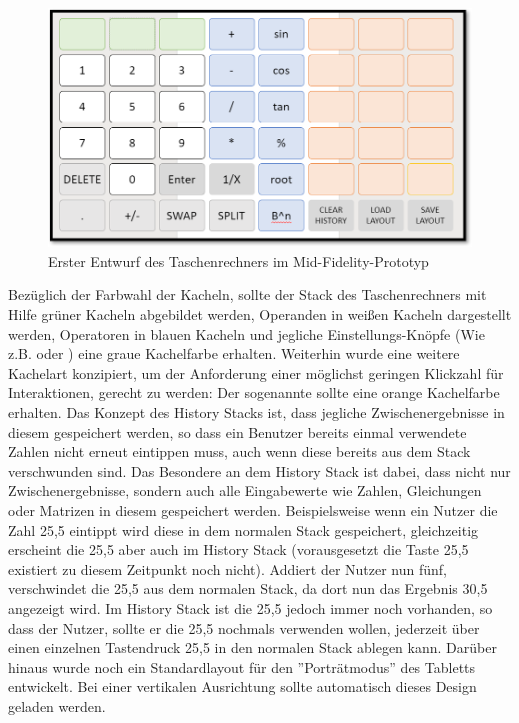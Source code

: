 \begin{figure}[!h]
	\includegraphics[scale=1]{img/erster-entwurf-mid-fidelty-prototyp}
	\caption[Erster Entwurf des Taschenrechners im Mid-Fidelity-Prototyp]{Erster Entwurf des Taschenrechners im Mid-Fidelity-Prototyp\footnotemark}
\end{figure}

Bezüglich der Farbwahl der Kacheln, sollte der Stack des Taschenrechners mit Hilfe grüner Kacheln abgebildet werden, Operanden in weißen Kacheln dargestellt werden, Operatoren in blauen Kacheln und jegliche Einstellungs-Knöpfe (Wie z.B.  oder ) eine graue Kachelfarbe erhalten. Weiterhin wurde eine weitere Kachelart konzipiert, um der Anforderung einer möglichst geringen Klickzahl für Interaktionen, gerecht zu werden: Der sogenannte  sollte eine orange Kachelfarbe erhalten. Das Konzept des History Stacks ist, dass jegliche Zwischenergebnisse in diesem gespeichert werden, so dass ein Benutzer bereits einmal verwendete Zahlen nicht erneut eintippen muss, auch wenn diese bereits aus dem Stack verschwunden sind. Das Besondere an dem History Stack ist dabei, dass nicht nur Zwischenergebnisse, sondern auch alle Eingabewerte wie Zahlen, Gleichungen oder Matrizen in diesem gespeichert werden. Beispielsweise wenn ein Nutzer die Zahl 25,5 eintippt wird diese in dem normalen Stack gespeichert, gleichzeitig erscheint die 25,5 aber auch im History Stack (vorausgesetzt die Taste 25,5 existiert zu diesem Zeitpunkt noch nicht). Addiert der Nutzer nun fünf, verschwindet die 25,5 aus dem normalen Stack, da dort nun das Ergebnis 30,5 angezeigt wird. Im History Stack ist die 25,5 jedoch immer noch vorhanden, so dass der Nutzer, sollte er die 25,5 nochmals verwenden wollen, jederzeit über einen einzelnen Tastendruck 25,5 in den normalen Stack ablegen kann. Darüber hinaus wurde noch ein Standardlayout für den ''Porträtmodus'' des Tabletts entwickelt. Bei einer vertikalen Ausrichtung sollte automatisch dieses Design geladen werden. 

